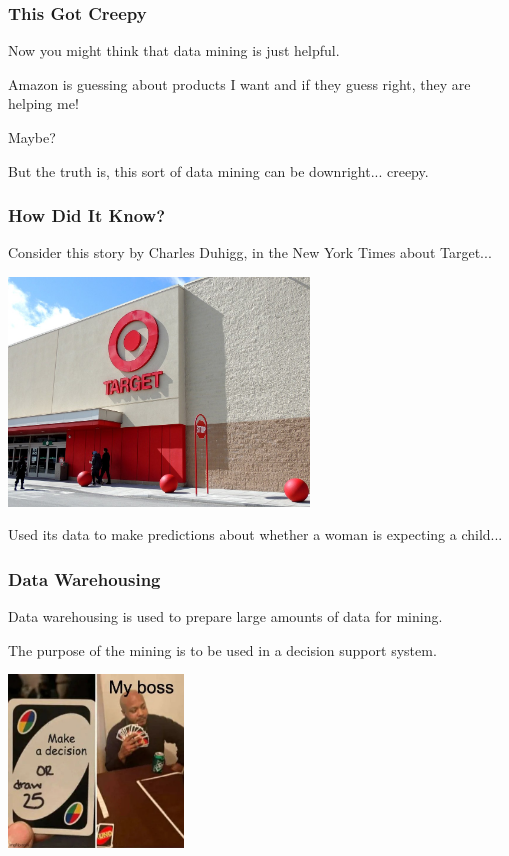 \begin{frame}
\frametitle{This Got Creepy}

Now you might think that data mining is just helpful.

Amazon is guessing about products I want and if they guess right, they are helping me! 

Maybe? 

But the truth is, this sort of data mining can be downright... creepy.

\end{frame}

\begin{frame}
\frametitle{How Did It Know?}

Consider this story by Charles Duhigg, in the New York Times about Target...

\begin{center}
	\includegraphics[width=0.6\textwidth]{images/target.jpg}
\end{center}

Used its data to make predictions about whether a woman is expecting a child...

\end{frame}

\begin{frame}
\frametitle{Data Warehousing}

Data warehousing is used to prepare large amounts of data for mining.

The purpose of the mining is to be used in a \alert{decision support system}. 

\begin{center}
	\includegraphics[width=0.35\textwidth]{images/draw25.jpg}
\end{center}

\end{frame}

